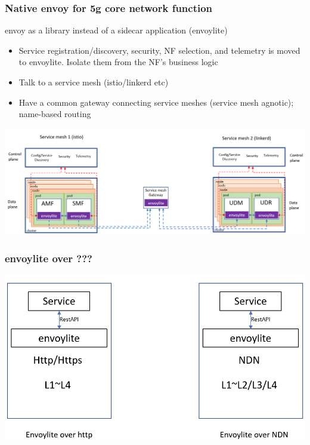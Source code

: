 \documentclass{beamer}
\begin{document}
\begin{frame}
  \frametitle{Native envoy for 5g core network function}
  envoy as a library instead of a sidecar application (envoylite)
  \begin{itemize}
    \item {Service registration/discovery, security, NF selection, and telemetry is moved to envoylite. Isolate them from the NF's business logic}
    \item {Talk to a service mesh (istio/linkerd etc)}
    \item {Have a common gateway connecting  service meshes (service mesh agnotic); name-based routing}
  \end{itemize}
  \center
  \includegraphics[width=\textwidth]{images/envoylite}
\end{frame}

\begin{frame}
  \frametitle{envoylite over ???}
  \center
  \includegraphics[width=\textwidth]{images/envoylite-stack}
\end{frame}
\end{document}
